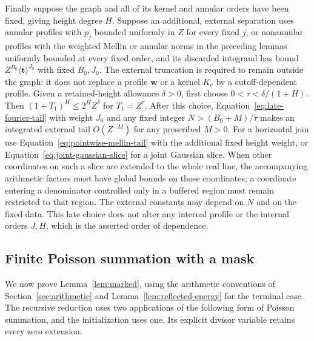 \documentclass[11pt,a4paper]{article}
\numberwithin{equation}{section}
\numberwithin{figure}{section}
\theoremstyle{definition}
\theoremstyle{remark}
\begin{document}
Finally suppose the graph and all of its kernel and annular orders have been
fixed, giving height degree $H$.  Suppose an additional, external separation
uses annular profiles with $p_j$ bounded uniformly in $Z$ for every fixed $j$,
or nonannular profiles with the weighted Mellin or annular norms in the
preceding lemmas uniformly bounded at every fixed order, and
its discarded integrand has bound $Z^{B_0}\langle\boldsymbol t\rangle^{J_0}$
with fixed $B_0,J_0$.  The external truncation is required to remain outside
the graph: it does not replace a profile $\boldsymbol w$ or a kernel $K_e$
by a cutoff-dependent profile.  Given a retained-height allowance $\delta>0$,
first choose $0<\tau<\delta/(1+H)$.  Then
$(1+T_1)^H\le2^H Z^\delta$ for $T_1=Z^\tau$.  After this choice,
Equation~\eqref{eq:late-fourier-tail} with weight $J_0$ and any fixed integer
$N>(B_0+M)/\tau$ makes an integrated external tail $O(Z^{-M})$ for any
prescribed $M>0$.
For a horizontal join use Equation~\eqref{eq:pointwise-mellin-tail} with the
additional fixed height weight, or Equation~\eqref{eq:joint-gaussian-slice}
for a joint Gaussian slice.  When other coordinates on such a slice are
extended to the whole real line, the accompanying arithmetic factors must
have global bounds on those coordinates; a coordinate entering a
denominator controlled only in a buffered region must remain restricted to
that region.  The external constants may depend on $N$ and on the fixed
data.  This late choice does not alter any internal profile or the internal
orders $J,H$, which is the asserted order of dependence.

\subsection{Finite Poisson summation with a mask}

We now prove Lemma~\ref{lem:marked}, using the arithmetic conventions of
Section~\ref{sec:arithmetic} and Lemma~\ref{lem:reflected-energy} for the
terminal case.  The recursive reduction uses two applications of the
following form of Poisson summation, and the initialization uses one.
Its explicit divisor variable retains every zero extension.
\end{document}
